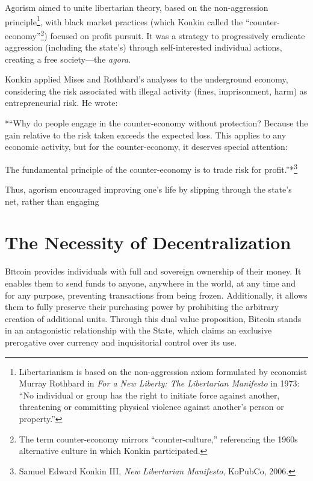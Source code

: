 \documentclass[
  a5paper,
  smalldemyvopaper,10pt,twoside,onecolumn,openright,extrafontsizes,hidelinks]{memoir}
\begin{document}
Agorism aimed to unite libertarian theory, based on the non-aggression
principle\footnote{Libertarianism is based on the non-aggression axiom
  formulated by economist Murray Rothbard in \emph{For a New Liberty:
  The Libertarian Manifesto} in 1973: ``No individual or group has the
  right to initiate force against another, threatening or committing
  physical violence against another's person or property.''}, with black
market practices (which Konkin called the
``counter-economy''\footnote{The term counter-economy mirrors
  ``counter-culture,'' referencing the 1960s alternative culture in
  which Konkin participated.}) focused on profit pursuit. It was a
strategy to progressively eradicate aggression (including the state's)
through self-interested individual actions, creating a free
society---the \emph{agora}.

Konkin applied Mises and Rothbard's analyses to the underground economy,
considering the risk associated with illegal activity (fines,
imprisonment, harm) as entrepreneurial risk. He wrote:

*``Why do people engage in the counter-economy without protection?
Because the gain relative to the risk taken exceeds the expected loss.
This applies to any economic activity, but for the counter-economy, it
deserves special attention:

The fundamental principle of the counter-economy is to trade risk for
profit.''*\footnote{Samuel Edward Konkin III, \emph{New Libertarian
  Manifesto}, KoPubCo, 2006.}

Thus, agorism encouraged improving one's life by slipping through the
state's net, rather than engaging


\chapter{The Necessity of Decentralization}\label{ch:adversaire}

\label{enotezch:4}{}

{B}\textsc{i}tcoin provides individuals with full and sovereign
ownership of their money. It enables them to send funds to anyone,
anywhere in the world, at any time and for any purpose, preventing
transactions from being frozen. Additionally, it allows them to fully
preserve their purchasing power by prohibiting the arbitrary creation of
additional units. Through this dual value proposition, Bitcoin stands in
an antagonistic relationship with the State, which claims an exclusive
prerogative over currency and inquisitorial control over its use.
\end{document}
